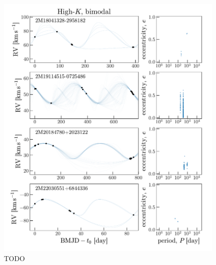 \documentclass[modern, letterpaper]{aastex62}
\begin{document}
\begin{figure}[hp]
\begin{center}
\includegraphics[width=\textwidth]{highK-bimodal}
\end{center}
\caption{%
TODO
\label{fig:highK-bimodal}
}
\end{figure}
\end{document}

